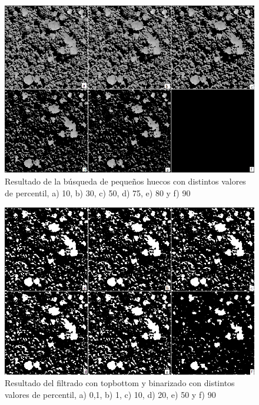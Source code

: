 \begin{figure}[h!]
    \includegraphics[width=\textwidth]{Imagenes/Resultados script morfologico/GS07-labeled.png}
     \caption{Resultado de la búsqueda de pequeños huecos con distintos valores de percentil, a) 10, b) 30, c) 50, d) 75, e) 80 y f) 90 }
    \label{pequenoshuecos}
\end{figure}
\begin{figure}[h!]
    \includegraphics[width=\textwidth]{Imagenes/Resultados script morfologico/GS09-labeled.png}
     \caption{Resultado del filtrado con topbottom y binarizado con distintos valores de percentil, a) 0,1, b) 1, c) 10, d) 20, e) 50 y f) 90 }
    \label{topbottom}
\end{figure}